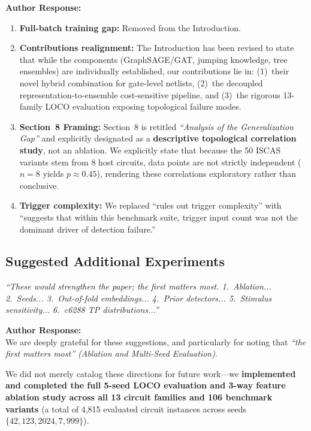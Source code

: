 \documentclass[11pt,a4paper]{article}
\newcommand{\reviewercomment}[1]{\vspace{4pt}\noindent\textcolor{revcomment}{\textit{``#1''}}\vspace{4pt}}
\newcommand{\authorresponse}{\noindent\textbf{Author Response:}}
\begin{document}
\authorresponse
\begin{enumerate}[leftmargin=*]
    \item \textbf{Full-batch training gap:} Removed from the Introduction.
    \item \textbf{Contributions realignment:} The Introduction has been revised to state that while the components (GraphSAGE/GAT, jumping knowledge, tree ensembles) are individually established, our contributions lie in: (1)~their novel hybrid combination for gate-level netlists, (2)~the decoupled representation-to-ensemble cost-sensitive pipeline, and (3)~the rigorous 13-family LOCO evaluation exposing topological failure modes.
    \item \textbf{Section~8 Framing:} Section~8 is retitled \textit{``Analysis of the Generalization Gap''} and explicitly designated as a \textbf{descriptive topological correlation study}, not an ablation. We explicitly state that because the 50 ISCAS variants stem from 8 host circuits, data points are not strictly independent ($n = 8$ yields $p \approx 0.45$), rendering these correlations exploratory rather than conclusive.
    \item \textbf{Trigger complexity:} We replaced ``rules out trigger complexity'' with ``suggests that within this benchmark suite, trigger input count was not the dominant driver of detection failure.''
\end{enumerate}

\subsection*{Suggested Additional Experiments}

\reviewercomment{These would strengthen the paper; the first matters most. 1.\ Ablation... 2.\ Seeds... 3.\ Out-of-fold embeddings... 4.\ Prior detectors... 5.\ Stimulus sensitivity... 6.\ c6288 TP distributions...}

\authorresponse\\
We are deeply grateful for these suggestions, and particularly for noting that \textit{``the first matters most'' (Ablation and Multi-Seed Evaluation)}.

We did not merely catalog these directions for future work---we \textbf{implemented and completed the full 5-seed LOCO evaluation and 3-way feature ablation study across all 13 circuit families and 106 benchmark variants} (a total of 4,815 evaluated circuit instances across seeds $\{42, 123, 2024, 7, 999\}$).
\end{document}
